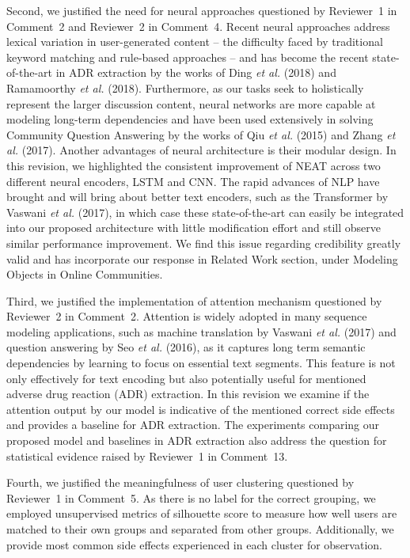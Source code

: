 \documentclass[11pt,a4paper]{letter} %
\begin{document}
\begin{letter}
Second, we justified the need for neural approaches questioned by Reviewer~1 in Comment~2 and Reviewer~2 in Comment~4. Recent neural approaches address lexical variation in user-generated content -- the difficulty faced by traditional keyword matching and rule-based approaches -- and has become the recent state-of-the-art in ADR extraction by the works of Ding \textit{et al.} (2018) and Ramamoorthy \textit{et al.} (2018). Furthermore, as our tasks seek to holistically represent the larger discussion content, neural networks are more capable at modeling long-term dependencies and have been used extensively in solving Community Question Answering by the works of Qiu \textit{et al.} (2015) and Zhang \textit{et al.} (2017). Another advantages of neural architecture is their modular design. In this revision, we highlighted the consistent improvement of NEAT across two different neural encoders, LSTM and CNN. The rapid advances of NLP have brought and will bring about better text encoders, such as the Transformer by Vaswani \textit{et al.} (2017), in which case these state-of-the-art can easily be integrated into our proposed architecture with little modification effort and still observe similar performance improvement. We find this issue regarding credibility greatly valid and has incorporate our response in Related Work section, under Modeling Objects in Online Communities.

Third, we justified the implementation of attention mechanism questioned by Reviewer~2 in Comment~2. Attention is widely adopted in many sequence modeling applications, such as machine translation by Vaswani \textit{et al.} (2017) and question answering by Seo \textit{et al.} (2016), as it captures long term semantic dependencies by learning to focus on essential text segments. This feature is not only effectively for text encoding but also potentially useful for mentioned adverse drug reaction (ADR) extraction. In this revision we examine if the attention output by our model is indicative of the mentioned correct side effects and provides a baseline for ADR extraction. The experiments comparing our proposed model and baselines in ADR extraction also address the question for statistical evidence raised by Reviewer~1 in Comment~13. 

Fourth, we justified the meaningfulness of user clustering questioned by Reviewer~1 in Comment~5. As there is no label for the correct grouping, we employed unsupervised metrics of silhouette score to measure how well users are matched to their own groups and separated from other groups. Additionally, we provide most common side effects experienced in each cluster for observation.


\end{letter}
\end{document}
